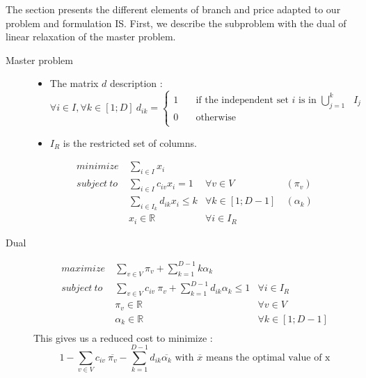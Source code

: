 The section presents the different elements of branch and price adapted to our problem and formulation IS. First, we describe the  subproblem with the dual of linear relaxation of the master problem.
\begin{description}
\item[Master problem]

\begin{itemize}
	\item The matrix $d$ description : 
	\[ \forall i \in I, \forall k \in [1;D]\ d_{ik} =
	\begin{cases}
	1       & \quad \text{if the independent set $i$ is in $\bigcup_{j=1}^{k}$ $I_{j}$}  \\
	0  		& \quad \text{otherwise }\\
	\end{cases}
	\]
	\item  $I_{R}$ is the restricted set of columns.
\end{itemize}

\begin{align}
minimize\   &  \displaystyle\sum_{i \in I} x_i &  & \label{IPCD:FE}\\
subject\ to &   \displaystyle\sum_{i \in I }{c_{iv} x_{i}} = 1   & \forall v \in V\  & (\pi_v) \label{IPCD:C1}\\
			&   \displaystyle\sum_{i \in I_k}{d_{ik}x_{i}} \leq k   & \forall k \in [1;D-1]\ & (\alpha_k) \label{IPCD:C2}\\
&  x_{i} \in \mathbb{R} &  \forall i \in I_{R}
\end{align}



\item[Dual]
\begin{align}
maximize\   &  \displaystyle\sum_{v \in V} \pi_v + \displaystyle\sum_{k=1}^{D-1} k \alpha_k   &   \label{ISD:FE}\\
subject\ to &  \displaystyle\sum_{v \in V} c_{iv}\ \pi_v + \displaystyle\sum_{k=1}^{D-1} d_{ik} \alpha_k \leq 1 & \forall i \in I_{R}\label{ISD:C1}\\
&  \pi_{v} \in \mathbb{R} &  \forall v \in V \\ 
&  \alpha_{k} \in \mathbb{R} &  \forall k \in [1;D-1] \\ 
\end{align}
This gives us a reduced cost to minimize :
\[1 - \displaystyle\sum_{v \in V} c_{iv}\ \overline{\pi_v} - \displaystyle\sum_{k=1}^{D-1} d_{ik} \overline{\alpha_k} \text{ with $\overline{x}$ means the optimal value of x}\]


\end{description}
